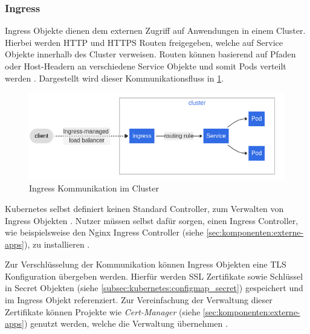 \subsubsection{Ingress}
\label{subsec:kubernetes:ingress}
Ingress Objekte dienen dem externen Zugriff auf Anwendungen in einem Cluster.
Hierbei werden HTTP und HTTPS Routen freigegeben, 
welche auf Service Objekte innerhalb des Cluster verweisen.
Routen können basierend auf Pfaden oder Host-Headern an verschiedene Service Objekte und somit Pods verteilt werden \cite{kubernetesIngress}.
Dargestellt wird dieser Kommunikationsfluss in \ref{fig:ingress_communication}.

\begin{figure}[h]
  \centering
  \includegraphics[width=\textwidth]{gfx/chapters/2_grundlagen/ingress.png}
  \caption{Ingress Kommunikation im Cluster}
  \label{fig:ingress_communication}
\end{figure}

Kubernetes selbst definiert keinen Standard Controller, zum Verwalten von Ingress Objekten \cite{Burns2019}.
Nutzer müssen selbst dafür sorgen, einen Ingress Controller, 
wie beispielsweise den Nginx Ingress Controller (siehe \ref{sec:komponenten:externe-apps}), zu installieren \cite{Burns2019}.

Zur Verschlüsselung der Kommunikation können Ingress Objekten eine TLS Konfiguration übergeben werden.
Hierfür werden SSL Zertifikate sowie Schlüssel in Secret Objekten (siehe \ref{subsec:kubernetes:configmap_secret}) gespeichert und im
Ingress Objekt referenziert. 
Zur Vereinfachung der Verwaltung dieser Zertifikate können Projekte wie \emph{Cert-Manager} (siehe \ref{sec:komponenten:externe-apps})
genutzt werden, welche die Verwaltung übernehmen \cite{Burns2019}.